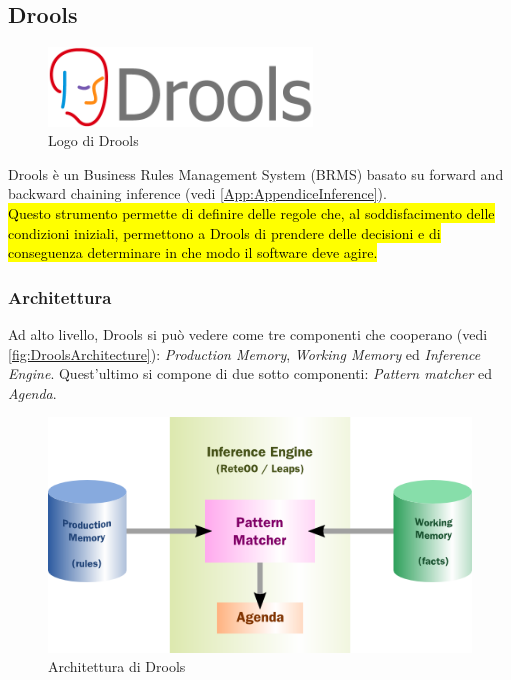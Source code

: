\subsection{Drools}
	\begin{figure}[H]
		\begin{center}
			\includegraphics[width=7cm]{Pics/drools-logo.png}
			\caption{Logo di Drools}
			\label{fig:DroolsLogo}
		\end{center}
	\end{figure}
	Drools è un Business Rules Management System (BRMS) basato su forward and backward chaining inference (vedi \autoref{App:AppendiceInference}). \\
	\hl{Questo strumento permette di definire delle regole che, al soddisfacimento delle condizioni iniziali, permettono a Drools di prendere delle decisioni e di conseguenza determinare in che modo il software deve agire.}
	\subsubsection{Architettura}
	Ad alto livello, Drools si può vedere come tre componenti che cooperano (vedi  \autoref{fig:DroolsArchitecture}):\textit{ Production Memory}, \textit{Working Memory} ed \textit{Inference Engine}. Quest'ultimo si compone di due sotto componenti: \textit{Pattern matcher} ed \textit{Agenda}.
	\begin{figure}[H]
		\begin{center}
			\includegraphics[width=12cm]{Pics/drools_abstract_structure.png}
			\caption{Architettura di Drools}
			\label{fig:DroolsArchitecture}
		\end{center}
	\end{figure}
	
